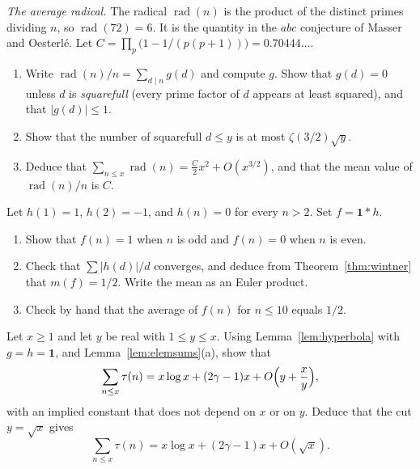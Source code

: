 \begin{exercise}[$\star\star$]\label{pb:radical}
\emph{The average radical.} The radical $\operatorname{rad}(n)$ is the product of the distinct primes dividing $n$, so $\operatorname{rad}(72)=6$. It is the quantity in the $abc$ conjecture of Masser and Oesterl\'e. Let $C=\prod_p\bigl(1-1/(p(p+1))\bigr)=0.70444\ldots$.
\begin{enumerate}[label=(\alph*)]
\item Write $\operatorname{rad}(n)/n=\sum_{d\mid n}g(d)$ and compute $g$. Show that $g(d)=0$ unless $d$ is \emph{squarefull} (every prime factor of $d$ appears at least squared), and that $|g(d)|\le1$.
\item Show that the number of squarefull $d\le y$ is at most $\zeta(3/2)\sqrt y$.
\item Deduce that $\sum_{n\le x}\operatorname{rad}(n)=\frac C2 x^2+O(x^{3/2})$, and that the mean value of $\operatorname{rad}(n)/n$ is $C$.
\end{enumerate}
\end{exercise}

\begin{exercise}[$\star$]\label{ex:avg6a}
Let $h(1)=1$, $h(2)=-1$, and $h(n)=0$ for every $n>2$. Set $f=\mathbf1*h$.
\begin{enumerate}[label=(\alph*)]
\item Show that $f(n)=1$ when $n$ is odd and $f(n)=0$ when $n$ is even.
\item Check that $\sum|h(d)|/d$ converges, and deduce from Theorem~\ref{thm:wintner} that $m(f)=1/2$. Write the mean as an Euler product.
\item Check by hand that the average of $f(n)$ for $n\le10$ equals $1/2$.
\end{enumerate}
\end{exercise}

\begin{exercise}[$\star\star$]\label{ex:avg6b}
Let $x\ge1$ and let $y$ be real with $1\le y\le x$. Using Lemma~\ref{lem:hyperbola} with $g=h=\mathbf1$, and Lemma~\ref{lem:elemsums}(a), show that
\[
\sum_{n\le x}\tau(n)=x\log x+(2\gamma-1)x+O\Bigl(y+\frac xy\Bigr),
\]
with an implied constant that does not depend on $x$ or on $y$. Deduce that the cut $y=\sqrt x$ gives
\[
\sum_{n\le x}\tau(n)=x\log x+(2\gamma-1)x+O(\sqrt x).
\]
\end{exercise}

